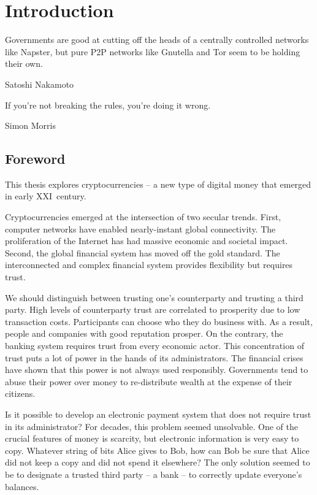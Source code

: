 \chapter{Introduction}

\label{Chapter01Introduction}

\epigraph{Governments are good at cutting off the heads of a centrally controlled networks like Napster, but pure P2P networks like Gnutella and Tor seem to be holding their own.}{Satoshi Nakamoto~\cite{Nakamoto2008}}
\epigraph{If you're not breaking the rules, you're doing it wrong.}{Simon Morris~\cite{Morris2018}}


\section{Foreword}

This thesis explores cryptocurrencies -- a new type of digital money that emerged in early XXI~century.

Cryptocurrencies emerged at the intersection of two secular trends.
First, computer networks have enabled nearly-instant global connectivity.
The proliferation of the Internet has had massive economic and societal impact.
Second, the global financial system has moved off the gold standard.
The interconnected and complex financial system provides flexibility but requires trust.

We should distinguish between trusting one's counterparty and trusting a third party.
High levels of counterparty trust are correlated to prosperity due to low transaction costs.
Participants can choose who they do business with.
As a result, people and companies with good reputation prosper.
On the contrary, the banking system requires trust from every economic actor.
This concentration of trust puts a lot of power in the hands of its administrators.
The financial crises have shown that this power is not always used responsibly.
Governments tend to abuse their power over money to re-distribute wealth at the expense of their citizens.

Is it possible to develop an electronic payment system that does not require trust in its administrator?
For decades, this problem seemed unsolvable.
One of the crucial features of money is scarcity, but electronic information is very easy to copy.
Whatever string of bits Alice gives to Bob, how can Bob be sure that Alice did not keep a copy and did not spend it elsewhere?
The only solution seemed to be to designate a trusted third party -- a bank -- to correctly update everyone's balances.

